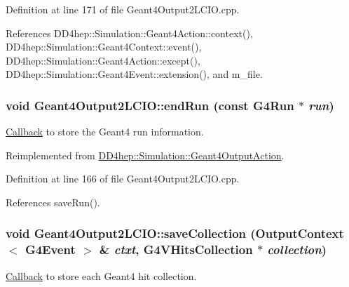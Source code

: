 Definition at line 171 of file Geant4Output2LCIO.cpp.

References DD4hep::Simulation::Geant4Action::context(), DD4hep::Simulation::Geant4Context::event(), DD4hep::Simulation::Geant4Action::except(), DD4hep::Simulation::Geant4Event::extension(), and m\_\-file.\hypertarget{class_d_d4hep_1_1_simulation_1_1_geant4_output2_l_c_i_o_a9365b2b05b745a7807ce06163a7977fb}{
\subsubsection[{endRun}]{\setlength{\rightskip}{0pt plus 5cm}void Geant4Output2LCIO::endRun (const G4Run $\ast$ {\em run})}}
\label{class_d_d4hep_1_1_simulation_1_1_geant4_output2_l_c_i_o_a9365b2b05b745a7807ce06163a7977fb}


\hyperlink{class_d_d4hep_1_1_callback}{Callback} to store the Geant4 run information. 

Reimplemented from \hyperlink{class_d_d4hep_1_1_simulation_1_1_geant4_output_action_ac89540100411ccec1804da9afbb843a4}{DD4hep::Simulation::Geant4OutputAction}.

Definition at line 166 of file Geant4Output2LCIO.cpp.

References saveRun().\hypertarget{class_d_d4hep_1_1_simulation_1_1_geant4_output2_l_c_i_o_aeba8f94323098614ee901a3ff0642c73}{
\subsubsection[{saveCollection}]{\setlength{\rightskip}{0pt plus 5cm}void Geant4Output2LCIO::saveCollection ({\bf OutputContext}$<$ G4Event $>$ \& {\em ctxt}, \/  {\bf G4VHitsCollection} $\ast$ {\em collection})}}
\label{class_d_d4hep_1_1_simulation_1_1_geant4_output2_l_c_i_o_aeba8f94323098614ee901a3ff0642c73}


\hyperlink{class_d_d4hep_1_1_callback}{Callback} to store each Geant4 hit collection. 

